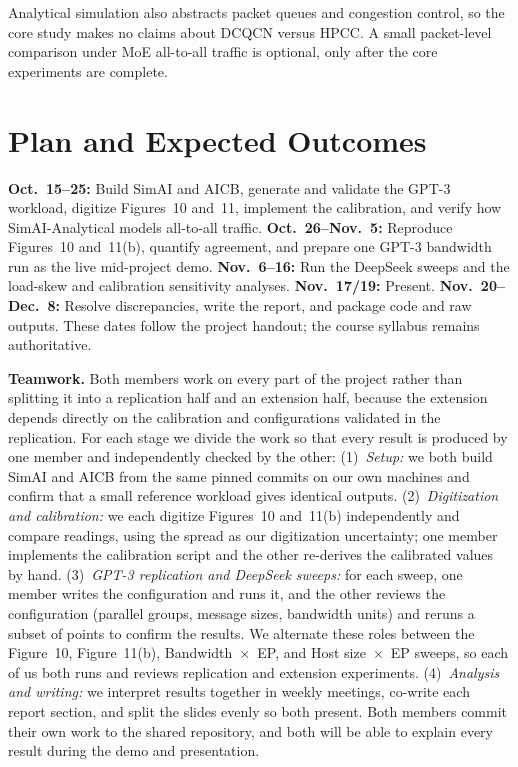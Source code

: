 \documentclass[letterpaper,twocolumn,10pt]{article}
\begin{document}
Analytical simulation also abstracts packet queues and congestion control, so the core study makes no claims about DCQCN versus HPCC. A small packet-level comparison under MoE all-to-all traffic is optional, only after the core experiments are complete.

\section{Plan and Expected Outcomes}
\textbf{Oct.~15--25:} Build SimAI and AICB, generate and validate the GPT-3 workload, digitize Figures~10 and~11, implement the calibration, and verify how SimAI-Analytical models all-to-all traffic. \textbf{Oct.~26--Nov.~5:} Reproduce Figures~10 and~11(b), quantify agreement, and prepare one GPT-3 bandwidth run as the live mid-project demo. \textbf{Nov.~6--16:} Run the DeepSeek sweeps and the load-skew and calibration sensitivity analyses. \textbf{Nov.~17/19:} Present. \textbf{Nov.~20--Dec.~8:} Resolve discrepancies, write the report, and package code and raw outputs. These dates follow the project handout; the course syllabus remains authoritative.

\textbf{Teamwork.} Both members work on every part of the project rather than splitting it into a replication half and an extension half, because the extension depends directly on the calibration and configurations validated in the replication. For each stage we divide the work so that every result is produced by one member and independently checked by the other: (1)~\emph{Setup:} we both build SimAI and AICB from the same pinned commits on our own machines and confirm that a small reference workload gives identical outputs. (2)~\emph{Digitization and calibration:} we each digitize Figures~10 and~11(b) independently and compare readings, using the spread as our digitization uncertainty; one member implements the calibration script and the other re-derives the calibrated values by hand. (3)~\emph{GPT-3 replication and DeepSeek sweeps:} for each sweep, one member writes the configuration and runs it, and the other reviews the configuration (parallel groups, message sizes, bandwidth units) and reruns a subset of points to confirm the results. We alternate these roles between the Figure~10, Figure~11(b), Bandwidth~$\times$~EP, and Host size~$\times$~EP sweeps, so each of us both runs and reviews replication and extension experiments. (4)~\emph{Analysis and writing:} we interpret results together in weekly meetings, co-write each report section, and split the slides evenly so both present. Both members commit their own work to the shared repository, and both will be able to explain every result during the demo and presentation.
\end{document}
